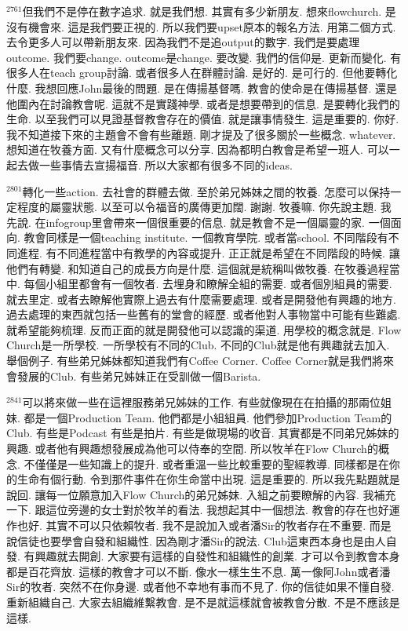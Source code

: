 \documentclass{book}
\begin{document}
$^{2761}$但我們不是停在數字追求.
就是我們想.
其實有多少新朋友.
想來flowchurch.
是沒有機會來.
這是我們要正視的.
所以我們要upset原本的報名方法.
用第二個方式.
去令更多人可以帶新朋友來.
因為我們不是追output的數字.
我們是要處理outcome.
我們要change.
outcome是change.
要改變.
我們的信仰是.
更新而變化.
有很多人在teach group討論.
或者很多人在群體討論.
是好的.
是可行的.
但他要轉化什麼.
我想回應John最後的問題.
是在傳揚基督嗎.
教會的使命是在傳揚基督.
還是他圍內在討論教會呢.
這就不是實踐神學.
或者是想要帶到的信息.
是要轉化我們的生命.
以至我們可以見證基督教會存在的價值.
就是讓事情發生.
這是重要的.
你好.
我不知道接下來的主題會不會有些離題.
剛才提及了很多關於一些概念.
whatever.
想知道在牧養方面.
又有什麼概念可以分享.
因為都明白教會是希望一班人.
可以一起去做一些事情去宣揚福音.
所以大家都有很多不同的ideas.

$^{2801}$轉化一些action.
去社會的群體去做.
至於弟兄姊妹之間的牧養.
怎麼可以保持一定程度的屬靈狀態.
以至可以令福音的廣傳更加闊.
謝謝.
牧養嘛.
你先說主題.
我先說.
在infogroup里會帶來一個很重要的信息.
就是教會不是一個屬靈的家.
一個面向.
教會同樣是一個teaching institute.
一個教育學院.
或者當school.
不同階段有不同進程.
有不同進程當中有教學的內容或提升.
正正就是希望在不同階段的時候.
讓他們有轉變.
和知道自己的成長方向是什麼.
這個就是統稱叫做牧養.
在牧養過程當中.
每個小組里都會有一個牧者.
去埋身和瞭解全組的需要.
或者個別組員的需要.
就去里定.
或者去瞭解他實際上過去有什麼需要處理.
或者是開發他有興趣的地方.
過去處理的東西就包括一些舊有的堂會的經歷.
或者他對人事物當中可能有些難處.
就希望能夠梳理.
反而正面的就是開發他可以認識的渠道.
用學校的概念就是.
Flow Church是一所學校.
一所學校有不同的Club.
不同的Club就是他有興趣就去加入.
舉個例子.
有些弟兄姊妹都知道我們有Coffee Corner.
Coffee Corner就是我們將來會發展的Club.
有些弟兄姊妹正在受訓做一個Barista.

$^{2841}$可以將來做一些在這裡服務弟兄姊妹的工作.
有些就像現在在拍攝的那兩位姐妹.
都是一個Production Team.
他們都是小組組員.
他們參加Production Team的Club.
有些是Podcast 有些是拍片.
有些是做現場的收音.
其實都是不同弟兄姊妹的興趣.
或者他有興趣想發展成為他可以侍奉的空間.
所以牧羊在Flow Church的概念.
不僅僅是一些知識上的提升.
或者重溫一些比較重要的聖經教導.
同樣都是在你的生命有個行動.
令到那件事件在你生命當中出現.
這是重要的.
所以我先點題就是說回.
讓每一位願意加入Flow Church的弟兄姊妹.
入組之前要瞭解的內容.
我補充一下.
跟這位旁邊的女士對於牧羊的看法.
我想起其中一個想法.
教會的存在也好運作也好.
其實不可以只依賴牧者.
我不是說加入或者潘Sir的牧者存在不重要.
而是說信徒也要學會自發和組織性.
因為剛才潘Sir的說法.
Club這東西本身也是由人自發.
有興趣就去開創.
大家要有這樣的自發性和組織性的創業.
才可以令到教會本身都是百花齊放.
這樣的教會才可以不斷.
像水一樣生生不息.
萬一像阿John或者潘Sir的牧者.
突然不在你身邊.
或者他不幸地有事而不見了.
你的信徒如果不懂自發.
重新組織自己.
大家去組織維繫教會.
是不是就這樣就會被教會分散.
不是不應該是這樣.
\end{document}
